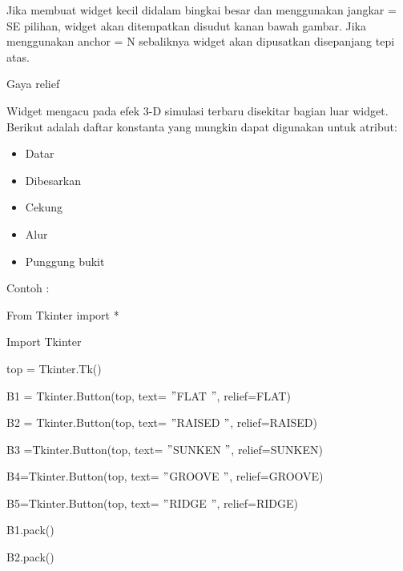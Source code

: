 \begin{itemize}
Jika membuat widget kecil didalam bingkai besar dan menggunakan jangkar = SE pilihan, widget akan ditempatkan disudut kanan bawah gambar. Jika menggunakan anchor = N sebaliknya widget akan dipusatkan disepanjang tepi atas. \par
\noindent 
Gaya relief \par
\noindent 
Widget mengacu pada efek 3-D simulasi terbaru disekitar bagian luar widget. Berikut adalah daftar konstanta yang mungkin dapat digunakan untuk atribut: \par
\noindent 
\begin{itemize}
\item Datar \par
\noindent 
\item Dibesarkan \par
\noindent 
\item Cekung \par
\noindent 
\item Alur \par
\noindent 
\item Punggung bukit\end{itemize}
 \par
\vspace{12pt}
Contoh : \par
{\fontsize{10pt}{10pt}\selectfont From Tkinter import *} \par
{\fontsize{10pt}{10pt}\selectfont Import Tkinter} \par
\vspace{10pt}
{\fontsize{10pt}{10pt}\selectfont top = Tkinter.Tk()} \par
{\fontsize{10pt}{10pt}\selectfont B1 = Tkinter.Button(top, text= $ " $FLAT $ " $, relief=FLAT)} \par
{\fontsize{10pt}{10pt}\selectfont B2 = Tkinter.Button(top, text= $ " $RAISED $ " $, relief=RAISED)} \par
{\fontsize{10pt}{10pt}\selectfont B3 =Tkinter.Button(top, text= $ " $SUNKEN $ " $, relief=SUNKEN)} \par
{\fontsize{10pt}{10pt}\selectfont B4=Tkinter.Button(top, text= $ " $GROOVE $ " $, relief=GROOVE)} \par
{\fontsize{10pt}{10pt}\selectfont B5=Tkinter.Button(top, text= $ " $RIDGE $ " $, relief=RIDGE)} \par
\vspace{10pt}
{\fontsize{10pt}{10pt}\selectfont B1.pack()} \par
{\fontsize{10pt}{10pt}\selectfont B2.pack()} \par

\end{itemize}
